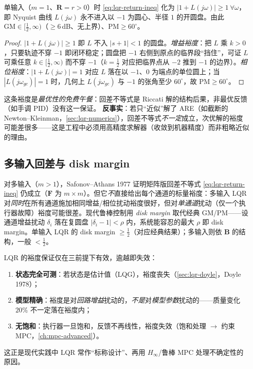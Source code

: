\begin{theorem}\label{thm:lqr-simargin}
单输入（$m=1$、$\mathbf R=r>0$）时 \cref{eq:lqr-return-ineq} 化为 $|1+L(j\omega)|\ge1\ \forall\omega$，即 Nyquist 曲线 $L(j\omega)$ 永不进入以 $-1$ 为圆心、半径 $1$ 的开圆盘。由此 $\mathrm{GM}\in[\tfrac12,\infty)$（$\ge6$\,dB、无上界）、$\mathrm{PM}\ge60^\circ$。
\end{theorem}

\begin{proof}
$|1+L(j\omega)|\ge1$ 即 $L$ 不入 $|s+1|<1$ 的圆盘。\emph{增益裕度}：把 $L$ 乘 $k>0$，只要轨迹不穿 $-1$ 即闭环稳定；圆盘把 $-1$ 右侧到原点的临界段“挡住”，可证 $L$ 可乘任意 $k\in[\tfrac12,\infty)$ 而不穿 $-1$（$k=\tfrac12$ 对应把临界点从 $-2$ 推到 $-1$ 的边界）。\emph{相位裕度}：$|1+L(j\omega)|=1$ 对应 $L$ 落在以 $-1$、$0$ 为端点的单位圆上；当 $|L(j\omega_{gc})|=1$ 时，几何上 $L(j\omega_{gc})$ 与 $-1$ 的张角至少 $60^\circ$，故 $\mathrm{PM}\ge60^\circ$。
\end{proof}

\begin{insight}
这条裕度是\emph{最优性的免费午餐}：回差不等式是 Riccati 解的结构后果，非最优反馈（如手调 PID）没有这一保证。
\textbf{反事实}：若只“近似”解了 ARE（如截断的 Newton--Kleinman，\cref{sec:lqr-numerics}），回差不等式\emph{不一定}成立，次优解的裕度可能差很多——这是工程中必须用高精度求解器（收敛到机器精度）而非粗略近似的理由。
\end{insight}

\subsection{多输入回差与 disk margin}
\label{sec:lqr-disk-margin}

对多输入（$m>1$），Safonov--Athans 1977\cite{safonov1977gain} 证明矩阵版回差不等式 \cref{eq:lqr-return-ineq} 仍成立（$\mathbf F$ 为 $m\times m$）。但它\emph{不}直接给出每个通道的标量裕度：多输入 LQR 对\emph{同时}在所有通道施加相同增益/相位扰动裕度很好，但对\emph{单通道}扰动（仅一个执行器故障）裕度可能很差。现代鲁棒控制用 \emph{disk margin} 取代经典 GM/PM——设通道增益扰动 $\delta_i$ 落在复圆盘 $|\delta_i-1|<\rho$ 内，系统能容忍的最大 $\rho$ 即 disk margin。单输入 LQR 的 disk margin $\ge\tfrac12$（对应经典结果）；多输入则依 $\mathbf B$ 的结构，一般 $<\tfrac12$。

\begin{pitfall}
LQR 的裕度保证仅在三前提下有效，逾越即失效：
\begin{enumerate}
  \item \textbf{状态完全可测}：若状态是估计值（LQG），裕度丧失（\cref{sec:lqr-doyle}，Doyle 1978）；
  \item \textbf{模型精确}：裕度是对\emph{回路增益}扰动的，\emph{不是}对\emph{模型参数}扰动的——质量变化 $20\%$ 不一定落在裕度内；
  \item \textbf{无饱和}：执行器一旦饱和，反馈不再线性，裕度失效（饱和处理 $\to$ 约束 MPC，\cref{ch:mpc-advanced}）。
\end{enumerate}
这正是现代实践中 LQR 常作“标称设计”、再用 $H_\infty$/鲁棒 MPC 处理不确定性的原因。
\end{pitfall}

